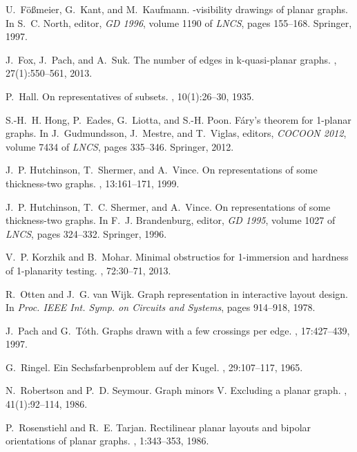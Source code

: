 \documentclass[runningheads]{llncs}
\begin{document}
\begin{thebibliography}{10}
U.~F{\"o}{\ss}meier, G.~Kant, and M.~Kaufmann.
-visibility drawings of planar graphs.
\newblock In S.~C. North, editor, {\em {GD} 1996}, volume 1190 of {\em {LNCS}},
  pages 155--168. Springer, 1997.

J.~Fox, J.~Pach, and A.~Suk.
\newblock The number of edges in k-quasi-planar graphs.
, 27(1):550--561, 2013.

P.~Hall.
\newblock On representatives of subsets.
, 10(1):26–30, 1935.

S.-H.~H. Hong, P.~Eades, G.~Liotta, and S.-H. Poon.
\newblock F{\'a}ry's theorem for 1-planar graphs.
\newblock In J.~Gudmundsson, J.~Mestre, and T.~Viglas, editors, {\em {COCOON}
  2012}, volume 7434 of {\em {LNCS}}, pages 335--346. Springer, 2012.

J.~P. Hutchinson, T.~Shermer, and A.~Vince.
\newblock On representations of some thickness-two graphs.
, 13:161--171, 1999.

J.~P. Hutchinson, T.~C. Shermer, and A.~Vince.
\newblock On representations of some thickness-two graphs.
\newblock In F.~J. Brandenburg, editor, {\em {GD} 1995}, volume 1027 of {\em
  {LNCS}}, pages 324--332. Springer, 1996.

V.~P. Korzhik and B.~Mohar.
\newblock Minimal obstructios for 1-immersion and hardness of 1-planarity
  testing.
, 72:30--71, 2013.

R.~Otten and J.~G. van Wijk.
\newblock Graph representation in interactive layout design.
\newblock In {\em Proc. {IEEE} Int. Symp. on Circuits and Systems}, pages
  914--918, 1978.

J.~Pach and G.~T{\'o}th.
\newblock Graphs drawn with a few crossings per edge.
, 17:427--439, 1997.

G.~Ringel.
\newblock Ein {S}echsfarbenproblem auf der {K}ugel.
, 29:107--117,
  1965.

N.~Robertson and P.~D. Seymour.
\newblock Graph minors {V}. {E}xcluding a planar graph.
, 41(1):92--114, 1986.

P.~Rosenstiehl and R.~E. Tarjan.
\newblock Rectilinear planar layouts and bipolar orientations of planar graphs.
, 1:343--353, 1986.


\end{thebibliography}
\end{document}
